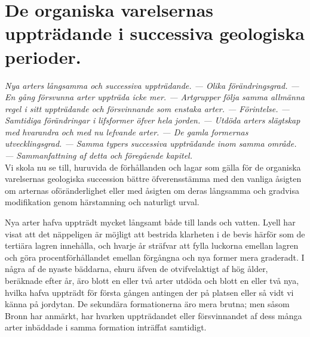 

\chapter[Succesivt uppträdande]{De organiska varelsernas uppträdande i successiva
geologiska perioder.}

{\it
Nya arters långsamma och successiva uppträdande. — Olika förändringsgrad. — En gång försvunna arter uppträda icke mer. — Artgrupper följa samma allmänna regel i sitt uppträdande och försvinnande som enstaka arter. — Förintelse. — Samtidiga förändringar i lifsformer öfver hela jorden. — Utdöda arters slägtskap med hvarandra och med nu lefvande arter. — De gamla formernas utvecklingsgrad. — Samma typers successiva uppträdande inom samma område. — Sammanfattning af detta och föregående kapitel.
}\\[0.5cm]

Vi skola nu se till, huruvida de förhållanden och lagar som gälla för de organiska varelsernas geologiska succession bättre öfverensstämma med den vanliga åsigten om arternas oföränderlighet eller med åsigten om deras långsamma och gradvisa modifikation genom härstamning och naturligt urval.

Nya arter hafva uppträdt mycket långsamt både till lands och vatten. Lyell har visat att det näppeligen är möjligt att bestrida klarheten i de bevis härför som de tertiära lagren innehålla, och hvarje år sträfvar att fylla luckorna emellan lagren och göra procentförhållandet emellan förgångna och nya former mera graderadt. I några af de nyaste bäddarna, ehuru äfven de otvifvelaktigt af hög ålder, beräknade efter år, äro blott en eller två arter utdöda och blott en eller två nya, hvilka hafva uppträdt för första gången antingen der på platsen eller så vidt vi känna på jordytan. De sekundära formationerna äro mera brutna; men såsom Bronn har anmärkt, har hvarken uppträdandet eller försvinnandet af dess många arter inbäddade i samma formation inträffat samtidigt.

